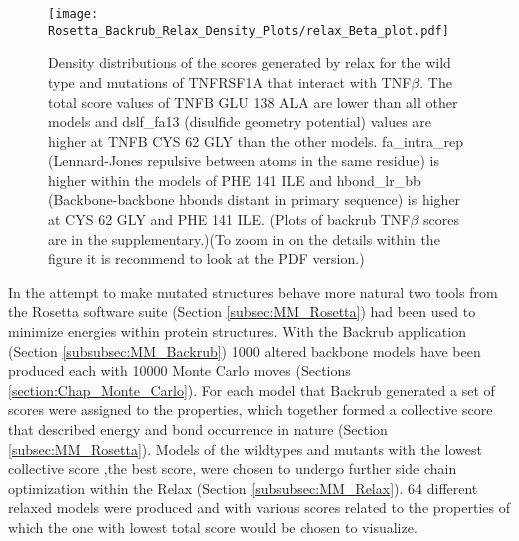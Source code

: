 	\newpage
		
	\begin{figure}[!ht]
		\centering
		\texttt{[image: Rosetta\_Backrub\_Relax\_Density\_Plots/relax\_Beta\_plot.pdf]}
		\caption[TNFRSF1A homotimer with TNF$\beta$ homotrimer relax score density plots]{Density distributions of the scores generated by relax for the wild type and mutations of TNFRSF1A that interact with TNF$\beta$. The total score values of TNFB GLU 138 ALA are lower than all other models and dslf\_fa13 (disulfide geometry potential) values are higher at TNFB CYS 62 GLY than the other models. fa\_intra\_rep (Lennard-Jones repulsive between atoms in the same residue) is higher within the models of PHE 141 ILE and hbond\_lr\_bb (Backbone-backbone hbonds distant in primary sequence) is higher at CYS 62 GLY and PHE 141 ILE.
		(Plots of backrub TNF$\beta$ scores are in the supplementary.)(To zoom in on the details within the figure it is recommend to look at the PDF version.)}
		\label{fig:relax_TNFB_scores}
	\end{figure}

	\newpage
	
	In the attempt to make mutated structures behave more natural two tools from the Rosetta software suite (Section \ref{subsec:MM_Rosetta}) had been used to minimize energies within protein structures. With the Backrub application (Section \ref{subsubsec:MM_Backrub}) 1000 altered backbone models have been produced each with 10000 Monte Carlo moves (Sections \ref{section:Chap_Monte_Carlo}). For each model that Backrub generated a set of scores were assigned to the properties, which together formed a collective score that described energy and bond occurrence in nature (Section \ref{subsec:MM_Rosetta}). Models of the wildtypes and mutants with the lowest collective score ,the best score, were chosen to undergo further side chain optimization within the Relax (Section \ref{subsubsec:MM_Relax}). 64 different relaxed models were produced and with various scores related to the properties of which the one with lowest total score would be chosen to visualize. 
	
